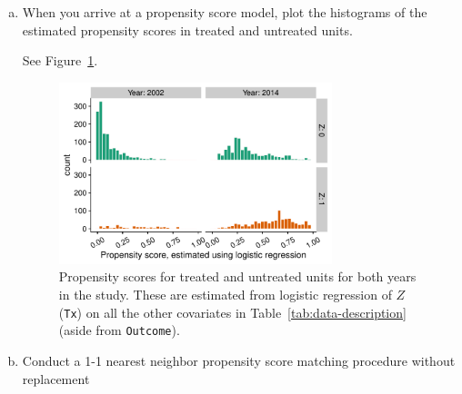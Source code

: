 \documentclass[11pt,letter]{article}
\newcommand{\sw}[1]{\textcolor{blue}{#1}}
\begin{document}
\begin{enumerate}[(a)]
\item
  \begin{quoting}
    When you arrive at a propensity score model, plot the histograms
    of the estimated propensity scores in treated and untreated units.
  \end{quoting}
  See Figure~\ref{fig:propensity-logistic}. 
  \begin{figure}[ht]
    \centering
    \includegraphics[width=0.75\textwidth]{figures/prop-count-logistic.pdf}
    \caption{\label{fig:propensity-logistic} Propensity scores for
      treated and untreated units for both years in the study.  These
      are estimated from logistic regression of $Z$ (\texttt{Tx}) on
      all the other covariates in Table~\ref{tab:data-description}
      (aside from \texttt{Outcome}).  %
    }
  \end{figure}
\item
  \begin{quoting}
    Conduct a 1-1 nearest neighbor propensity score matching procedure
    without replacement
  \end{quoting}


\end{enumerate}
\end{document}
